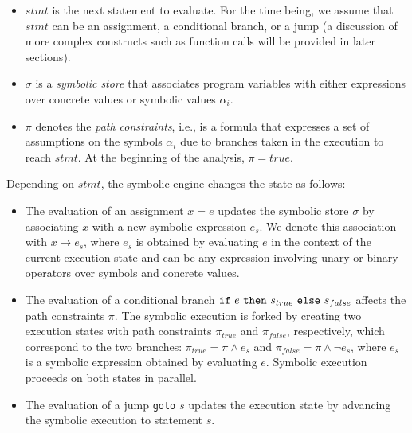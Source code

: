 \begin{itemize}

\item $stmt$ is the next statement to evaluate. For the time being, we assume that $stmt$ can be an assignment, a conditional branch, or a jump (a discussion of more complex constructs such as function calls will be provided in later sections).


\item $\sigma$ is a {\em symbolic store} that associates program variables with either expressions over concrete values or symbolic values $\alpha_i$.

\item $\pi$ denotes the {\em path constraints}, i.e., is a formula that expresses a set of assumptions on the symbols $\alpha_i$ due to branches taken in the execution to reach $stmt$. At the beginning of the analysis, $\pi=true$.

\end{itemize}

\noindent Depending on $stmt$, the symbolic engine changes the state as follows:

\begin{itemize}
  \item The evaluation of an assignment $x=e$ updates the symbolic store $\sigma$ by associating $x$ with a new symbolic expression $e_s$. We denote this association with $x\mapsto e_s$, where $e_s$ is obtained by evaluating $e$ in the context of the current execution state and  can be any expression involving unary or binary operators over symbols and concrete values.
  

  \item The evaluation of a conditional branch ${\tt if}~e~{\tt then}~s_{true}~{\tt else}~s_{false}$ affects the path constraints $\pi$. The symbolic execution is forked by creating two execution states with path constraints $\pi_{true}$ and $\pi_{false}$, respectively, which correspond to the two branches: $\pi_{true}=\pi \wedge e_s$ and $\pi_{false}=\pi \wedge \neg e_s$, where $e_s$ is a symbolic expression obtained by evaluating $e$. 
    Symbolic execution proceeds on both states in parallel.

  \item The evaluation of a jump {\tt goto} $s$ updates the execution state by advancing the symbolic execution to statement $s$. 
\end{itemize}

